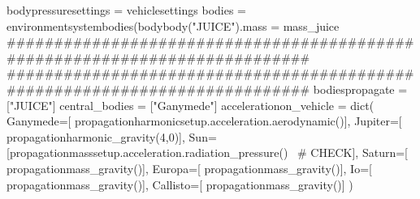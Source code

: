 {}
\markdownRendererSectionEnd \markdownRendererSectionBegin
{}\markdownRendererInterblockSeparator
{}bodypressuresettings = vehiclesettings\markdownRendererInterblockSeparator
{}
\markdownRendererSectionEnd \markdownRendererSectionBegin
{}\markdownRendererInterblockSeparator
{}bodies = environmentsystembodies(bodybody("JUICE").mass = mass_juice\markdownRendererInterblockSeparator
{}###########################################################################\markdownRendererInterblockSeparator
{}
\markdownRendererSectionEnd \markdownRendererSectionBegin
{}\markdownRendererInterblockSeparator
{}###########################################################################\markdownRendererInterblockSeparator
{}
\markdownRendererSectionEnd \markdownRendererSectionBegin
{}\markdownRendererInterblockSeparator
{}bodiespropagate = ["JUICE"] central_bodies = ["Ganymede"]\markdownRendererInterblockSeparator
{}
\markdownRendererSectionEnd \markdownRendererSectionBegin
{}\markdownRendererInterblockSeparator
{}accelerationon_vehicle = dict( Ganymede=[ propagationharmonicsetup.acceleration.aerodynamic()], Jupiter=[ propagationharmonic_gravity(4,0)], Sun=[propagationmasssetup.acceleration.radiation_pressure()  # CHECK], Saturn=[ propagationmass_gravity()], Europa=[ propagationmass_gravity()], Io=[ propagationmass_gravity()], Callisto=[ propagationmass_gravity()] )\markdownRendererInterblockSeparator
{}
\markdownRendererSectionEnd \markdownRendererSectionBegin
{}\markdownRendererInterblockSeparator
